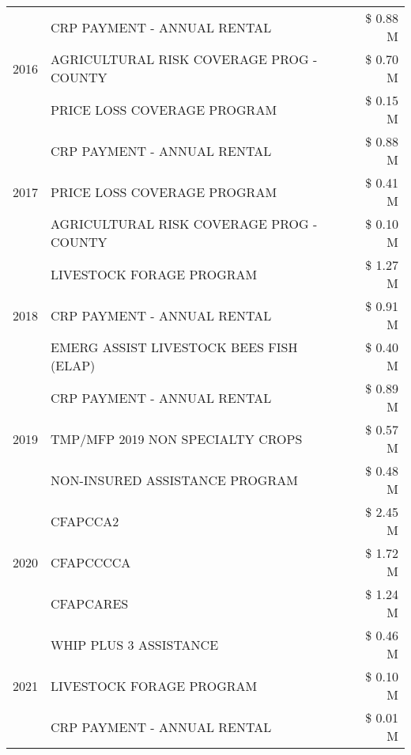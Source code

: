 \begin{tabular}{llr}
\cline{1-3}
\multirow[t]{3}{*}{2016} & CRP PAYMENT - ANNUAL RENTAL                   & \$ 0.88 M \\
 & AGRICULTURAL RISK COVERAGE PROG - COUNTY      & \$ 0.70 M \\
 & PRICE LOSS COVERAGE PROGRAM                   & \$ 0.15 M \\
\cline{1-3}
\multirow[t]{3}{*}{2017} & CRP PAYMENT - ANNUAL RENTAL & \$ 0.88 M \\
 & PRICE LOSS COVERAGE PROGRAM & \$ 0.41 M \\
 & AGRICULTURAL RISK COVERAGE PROG - COUNTY & \$ 0.10 M \\
\cline{1-3}
\multirow[t]{3}{*}{2018} & LIVESTOCK FORAGE PROGRAM & \$ 1.27 M \\
 & CRP PAYMENT - ANNUAL RENTAL & \$ 0.91 M \\
 & EMERG ASSIST LIVESTOCK BEES FISH (ELAP) & \$ 0.40 M \\
\cline{1-3}
\multirow[t]{3}{*}{2019} & CRP PAYMENT - ANNUAL RENTAL & \$ 0.89 M \\
 & TMP/MFP 2019 NON SPECIALTY CROPS & \$ 0.57 M \\
 & NON-INSURED ASSISTANCE PROGRAM & \$ 0.48 M \\
\cline{1-3}
\multirow[t]{3}{*}{2020} & CFAPCCA2 & \$ 2.45 M \\
 & CFAPCCCCA & \$ 1.72 M \\
 & CFAPCARES & \$ 1.24 M \\
\cline{1-3}
\multirow[t]{3}{*}{2021} & WHIP PLUS 3 ASSISTANCE & \$ 0.46 M \\
 & LIVESTOCK FORAGE PROGRAM & \$ 0.10 M \\
 & CRP PAYMENT - ANNUAL RENTAL & \$ 0.01 M \\
\cline{1-3}
\bottomrule
\end{tabular}
